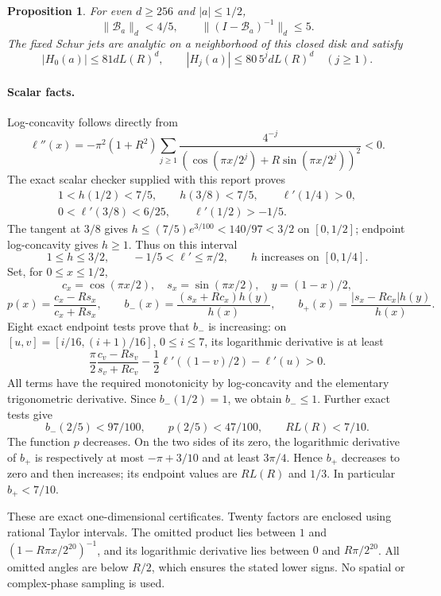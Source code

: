 \documentclass[11pt,a4paper]{article}
\newtheorem{proposition}[theorem]{Proposition}
\theoremstyle{remark}\newtheorem*{ednote}{Editorial note (ProveIt, 2026-10-01)}
\begin{document}
\begin{proposition}\label{prop:green}
For even $d\ge256$ and $|a|\le1/2$,
\[
 \|\mathcal B_a\|_d<4/5,\qquad
 \|(I-\mathcal B_a)^{-1}\|_d\le5.
\]
The fixed Schur jets are analytic on a neighborhood of this closed disk and satisfy
\begin{equation}\label{eq:disk}
 |H_0(a)|\le81dL(R)^d,\qquad
 |H_j(a)|\le80\,5^j dL(R)^d\quad(j\ge1).
\end{equation}
\end{proposition}

\paragraph{Scalar facts.}
Log-concavity follows directly from
\[
 \ell''(x)=-\pi^2(1+R^2)\sum_{j\ge1}
 \frac{4^{-j}}{(\cos(\pi x/2^j)+R\sin(\pi x/2^j))^2}<0.
\]
The exact scalar checker supplied with this report proves
\begin{gather*}
 1<h(1/2)<7/5,\qquad h(3/8)<7/5,\qquad \ell'(1/4)>0,\\
 0<\ell'(3/8)<6/25,\qquad \ell'(1/2)>-1/5.
\end{gather*}
The tangent at $3/8$ gives
$h\le(7/5)e^{3/100}<140/97<3/2$ on $[0,1/2]$; endpoint log-concavity gives $h\ge1$. Thus on this interval
\begin{equation}\label{eq:scalarh}
 1\le h\le3/2,\qquad -1/5<\ell'\le\pi/2,
 \qquad h\text{ increases on }[0,1/4].
\end{equation}
Set, for $0\le x\le1/2$,
\[
 c_x=\cos(\pi x/2),\quad s_x=\sin(\pi x/2),\quad y=(1-x)/2,
\]
\[
 p(x)=\frac{c_x-Rs_x}{c_x+Rs_x},\qquad
 b_-(x)=\frac{(s_x+Rc_x)h(y)}{h(x)},\qquad
 b_+(x)=\frac{|s_x-Rc_x|h(y)}{h(x)}.
\]
Eight exact endpoint tests prove that $b_-$ is increasing: on
$[u,v]=[i/16,(i+1)/16]$, $0\le i\le7$, its logarithmic derivative is at least
\[
 \frac\pi2\frac{c_v-Rs_v}{s_v+Rc_v}
 -\frac12\ell'((1-v)/2)-\ell'(u)>0.
\]
All terms have the required monotonicity by log-concavity and the elementary trigonometric derivative. Since $b_-(1/2)=1$, we obtain $b_-\le1$. Further exact tests give
\[
 b_-(2/5)<97/100,\qquad p(2/5)<47/100,\qquad RL(R)<7/10.
\]
The function $p$ decreases. On the two sides of its zero, the logarithmic derivative of $b_+$ is respectively at most $-\pi+3/10$ and at least $3\pi/4$. Hence $b_+$ decreases to zero and then increases; its endpoint values are $RL(R)$ and $1/3$. In particular $b_+<7/10$.

These are exact one-dimensional certificates. Twenty factors are enclosed using rational Taylor intervals. The omitted product lies between $1$ and
$(1-R\pi x/2^{20})^{-1}$, and its logarithmic derivative lies between $0$ and $R\pi/2^{20}$. All omitted angles are below $R/2$, which ensures the stated lower signs. No spatial or complex-phase sampling is used.
\end{document}

